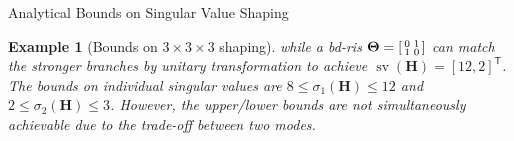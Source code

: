 \documentclass[journal]{IEEEtran}
\DeclareMathOperator{\sv}{sv}
\newtheorem{example}{Example}
\begin{document}
\begin{section}{Analytical Bounds on Singular Value Shaping}
\begin{example}[Bounds on $3 \times 3 \times 3$ shaping]
			while a \gls{bd}-\gls{ris} $\mathbf{\Theta} = \begin{bsmallmatrix} 0 & 1 \\ 1 & 0 \end{bsmallmatrix}$ can match the stronger branches by unitary transformation to achieve $\sv(\mathbf{H}) = [12, 2]^\mathsf{T}$.
			The bounds on individual singular values are $8 \le \sigma_1(\mathbf{H}) \le 12$ and $2 \le \sigma_2(\mathbf{H}) \le 3$.
			However, the upper/lower bounds are not simultaneously achievable due to the trade-off between two modes.

		\end{example}


\end{section}
\end{document}
